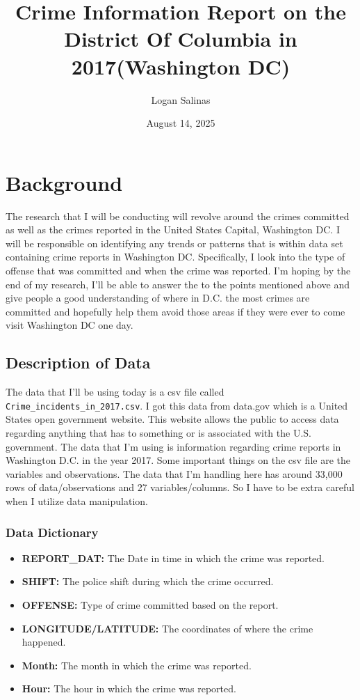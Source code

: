 \documentclass[
]{article}
\title{Crime Information Report on the District Of Columbia in
2017(Washington DC)}
\author{Logan Salinas}
\date{August 14, 2025}
\providecommand{\tightlist}{%
  \setlength{\itemsep}{0pt}\setlength{\parskip}{0pt}}
\begin{document}
\maketitle

\clearpage

\section{Background}\label{background}

The research that I will be conducting will revolve around the crimes
committed as well as the crimes reported in the United States Capital,
Washington DC. I will be responsible on identifying any trends or
patterns that is within data set containing crime reports in Washington
DC. Specifically, I look into the type of offense that was committed and
when the crime was reported. I'm hoping by the end of my research, I'll
be able to answer the to the points mentioned above and give people a
good understanding of where in D.C. the most crimes are committed and
hopefully help them avoid those areas if they were ever to come visit
Washington DC one day.

\subsection{Description of Data}\label{description-of-data}

The data that I'll be using today is a csv file called
\texttt{Crime\_incidents\_in\_2017.csv}. I got this data from data.gov
which is a United States open government website. This website allows
the public to access data regarding anything that has to something or is
associated with the U.S. government. The data that I'm using is
information regarding crime reports in Washington D.C. in the year 2017.
Some important things on the csv file are the variables and
observations. The data that I'm handling here has around 33,000 rows of
data/observations and 27 variables/columns. So I have to be extra
careful when I utilize data manipulation.

\subsubsection{Data Dictionary}\label{data-dictionary}

\begin{itemize}
\tightlist
\item
  \textbf{REPORT\_DAT:} The Date in time in which the crime was
  reported.
\item
  \textbf{SHIFT:} The police shift during which the crime occurred.
\item
  \textbf{OFFENSE:} Type of crime committed based on the report.
\item
  \textbf{LONGITUDE/LATITUDE:} The coordinates of where the crime
  happened.
\item
  \textbf{Month:} The month in which the crime was reported.
\item
  \textbf{Hour:} The hour in which the crime was reported.
\end{itemize}
\end{document}
